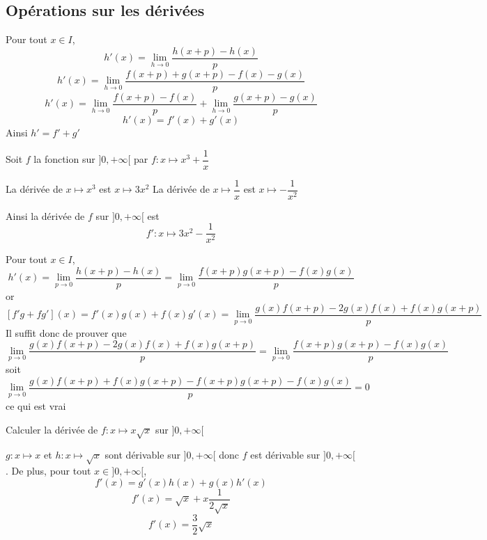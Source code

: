 \subsection{Opérations sur les dérivées}
\newline

\begin{preuve}
Pour tout $x\in I$, $$h'(x) = \lim_{h\rightarrow 0} \dfrac{h(x+p) - h(x)}{p}$$
$$h'(x) = \lim_{h\rightarrow 0} \dfrac{f(x+p) + g(x+p) - f(x) - g(x)}{p}$$
$$h'(x) = \lim_{h\rightarrow 0} \dfrac{f(x+p) - f(x)}{p} + \lim_{h\rightarrow 0} \dfrac{g(x+p) - g(x)}{p}$$
$$h'(x) = f'(x) + g'(x)$$
Ainsi $h' = f'+g'$
\end{preuve}

\begin{exemple}
Soit $f$ la fonction sur $]0,+\infty[$ par $f:x\mapsto x^3 + \dfrac{1}{x}$\newline

La dérivée de $x\mapsto x^3$ est $x\mapsto 3x^2$\newline
La dérivée de $x\mapsto \dfrac{1}{x}$ est $x\mapsto -\dfrac{1}{x^2}$\newline

Ainsi la dérivée de $f$ sur $]0,+\infty[$ est $$f':x\mapsto 3x^2 - \dfrac{1}{x^2}$$
\end{exemple}
\newline

\begin{preuve}
Pour tout $x\in I$, 
$$h'(x) = \lim_{p \rightarrow 0} \dfrac{h(x+p) - h(x)}{p} = \lim_{p \rightarrow 0} \dfrac{f(x+p)g(x+p) - f(x)g(x)}{p}$$
or 
$$[f'g + fg'](x) = f'(x)g(x) + f(x)g'(x) = \lim_{p\rightarrow 0}\dfrac{g(x)f(x+p) - 2g(x)f(x) + f(x)g(x+p)}{p}$$
Il suffit donc de prouver que 
$$\lim_{p\rightarrow 0}\dfrac{g(x)f(x+p) - 2g(x)f(x) + f(x)g(x+p)}{p} = \lim_{p \rightarrow 0} \dfrac{f(x+p)g(x+p) - f(x)g(x)}{p}$$
soit
$$\lim_{p\rightarrow 0}\dfrac{g(x)f(x+p) + f(x)g(x+p) - f(x+p)g(x+p) - f(x)g(x)}{p} = 0$$
ce qui est vrai
\end{preuve}

\begin{exemple}
Calculer la dérivée de $f:x\mapsto x\sqrt{x}$ sur $]0,+\infty[$\newline

$g:x\mapsto x$ et $h:x\mapsto \sqrt{x}$ sont dérivable sur $]0,+\infty[$ donc $f$ est dérivable sur $]0,+\infty[$. De plus, pour tout $x\in ]0,+\infty[$,
$$f'(x) = g'(x)h(x) + g(x)h'(x)$$
$$f'(x) = \sqrt{x} + x \dfrac{1}{2\sqrt{x}}$$
$$f'(x) = \dfrac{3}{2} \sqrt{x}$$
\end{exemple}
\newline

